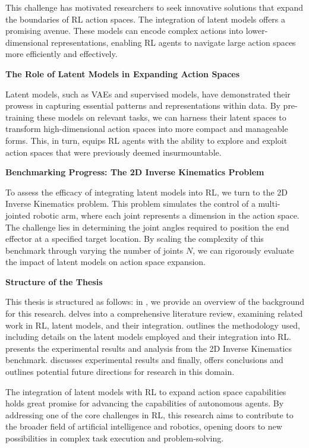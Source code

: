 This challenge has motivated researchers to seek innovative solutions that expand the boundaries of RL action spaces. The integration of latent models offers a promising avenue. These models can encode complex actions into lower-dimensional representations, enabling RL agents to navigate large action spaces more efficiently and effectively.

\textbf{The Role of Latent Models in Expanding Action Spaces}

Latent models, such as VAEs and supervised models, have demonstrated their prowess in capturing essential patterns and representations within data. By pre-training these models on relevant tasks, we can harness their latent spaces to transform high-dimensional action spaces into more compact and manageable forms. This, in turn, equips RL agents with the ability to explore and exploit action spaces that were previously deemed insurmountable.

\textbf{Benchmarking Progress: The 2D Inverse Kinematics Problem}

To assess the efficacy of integrating latent models into RL, we turn to the 2D Inverse Kinematics problem. This problem simulates the control of a multi-jointed robotic arm, where each joint represents a dimension in the action space. The challenge lies in determining the joint angles required to position the end effector at a specified target location. By scaling the complexity of this benchmark through varying the number of joints $N$, we can rigorously evaluate the impact of latent models on action space expansion.

\textbf{Structure of the Thesis}

This thesis is structured as follows: in , we provide an overview of the background for this research.  delves into a comprehensive literature review, examining related work in RL, latent models, and their integration.  outlines the methodology used, including details on the latent models employed and their integration into RL.  presents the experimental results and analysis from the 2D Inverse Kinematics benchmark.  discusses experimental results and finally,  offers conclusions and outlines potential future directions for research in this domain.

The integration of latent models with RL to expand action space capabilities holds great promise for advancing the capabilities of autonomous agents. By addressing one of the core challenges in RL, this research aims to contribute to the broader field of artificial intelligence and robotics, opening doors to new possibilities in complex task execution and problem-solving.




